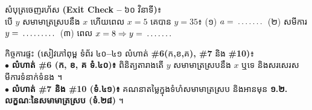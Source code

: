 \documentclass[a4paper,10pt]{article}
\newcommand{\en}[1]{{\TimesEn #1}}
\newcommand{\enbf}[1]{{\TimesEn\bfseries #1}}
\newcommand{\blank}[1][1.5cm]{\makebox[#1]{\dotfill}}
\begin{document}
\vspace{5pt}
\begin{tcolorbox}[enhanced, sharp corners, colback=white, colframe=black, boxrule=0.85pt, boxsep=2.5pt, top=3.5pt, bottom=3.5pt, left=5pt, right=5pt]
  {\muol\fontsize{8.8pt}{12.5pt}\selectfont សំបុត្រចេញរហ័ស \enbf{(Exit Check --} ៦០ វិនាទី\enbf{)}៖}\\[2pt]
  បើ $y$ សមាមាត្រស្របនឹង $x$ ហើយពេល $x=5$ គេបាន $y=35$៖
  (១) $a = \blank[1.2cm]$ \;\en{|}\;
  (២) សមីការ $y = \blank[1.5cm]$ \;\en{|}\;
  (៣) ពេល $x=8 \Rightarrow y = \blank[1.2cm]$
\end{tcolorbox}

\vspace{5pt}
\begin{tcolorbox}[enhanced, sharp corners, colback=panelgray, colframe=black, boxrule=0.85pt, boxsep=2.5pt, top=3.5pt, bottom=3.5pt, left=5pt, right=5pt]
  {\muol\fontsize{8.8pt}{12.5pt}\selectfont កិច្ចការផ្ទះ \enbf{(}សៀវភៅពុម្ព ទំព័រ ៤០\enbf{--}៤១ លំហាត់ \enbf{\#6(}ក\enbf{,}ខ\enbf{,}គ\enbf{), \#7} និង \enbf{\#10)}៖}\\[2pt]
  $\bullet$ \textbf{លំហាត់ \#6 (ក, ខ, គ ទំ.៤០)៖} ពិនិត្យតារាងតើ $y$ សមាមាត្រស្របនឹង $x$ ឬទេ និងសរសេរសមីការទំនាក់ទំនង ។\\
  $\bullet$ \textbf{លំហាត់ \#7 និង \#10 (ទំ.៤១)៖} គណនាតម្លៃក្នុងទំហំសមាមាត្រស្រប និងអានមុន \textbf{១.២. លក្ខណៈនៃសមាមាត្រស្រប (ទំ.២៨)} ។
\end{tcolorbox}
\end{document}
